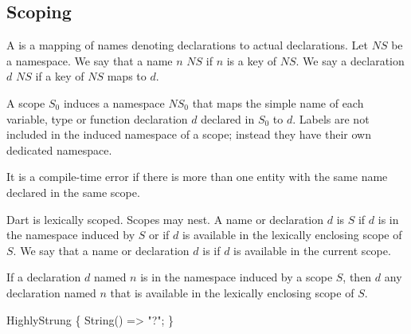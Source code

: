 \documentclass[makeidx]{article}
\begin{document}
\subsection{Scoping}

\LMHash{}%
A  is a mapping of names denoting declarations to actual declarations.
Let $NS$ be a namespace.
We say that a name $n$  $NS$ if $n$ is a key of $NS$.
We say a declaration $d$  $NS$ if a key of $NS$ maps to $d$.

\LMHash{}%
A scope $S_0$ induces a namespace $NS_0$ that maps the simple name of each variable, type or function declaration $d$ declared in $S_0$ to $d$.
Labels are not included in the induced namespace of a scope; instead they have their own dedicated namespace.


\LMHash{}%
It is a compile-time error if there is more than one entity with the same name declared in the same scope.


\LMHash{}%
Dart is lexically scoped.
Scopes may nest.
A name or declaration $d$ is  $S$ if $d$ is in the namespace induced by $S$ or if $d$ is available in the lexically enclosing scope of $S$.
We say that a name or declaration $d$ is  if $d$ is available in the current scope.

\LMHash{}%
If a declaration $d$ named $n$ is in the namespace induced by a scope $S$, then $d$  any declaration named $n$ that is available in the lexically enclosing scope of $S$.


\begin{dartCode}
\CLASS{} HighlyStrung \{
  String() => "?";
\}
\end{dartCode}
\end{document}
